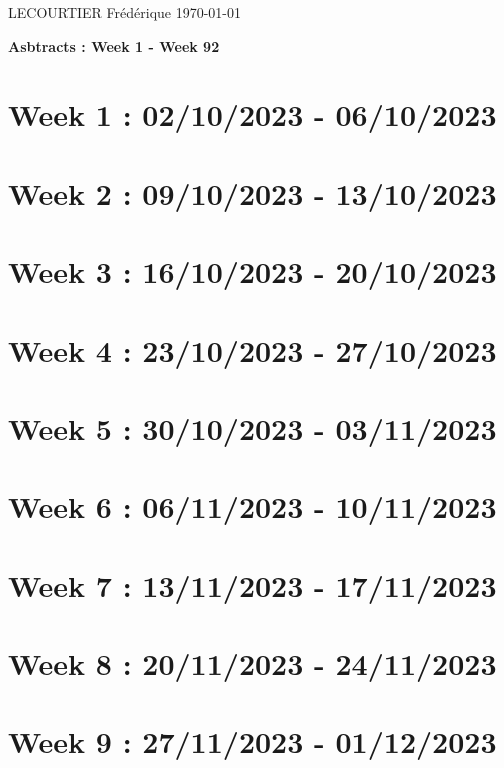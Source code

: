 \documentclass[french]{article}
\begin{document}
	LECOURTIER Frédérique \hfill \today
	\begin{center}
		\Large\textbf{{Asbtracts : Week 1 - Week 92}}
	\end{center}

	\section{Week 1 : 02/10/2023 - 06/10/2023}
	

	\section{Week 2 : 09/10/2023 - 13/10/2023}
	

	\section{Week 3 : 16/10/2023 - 20/10/2023}
	

	\section{Week 4 : 23/10/2023 - 27/10/2023}
	

	\section{Week 5 : 30/10/2023 - 03/11/2023}
	

	\section{Week 6 : 06/11/2023 - 10/11/2023}
	

	\section{Week 7 : 13/11/2023 - 17/11/2023}
	

	\section{Week 8 : 20/11/2023 - 24/11/2023}
	

	\section{Week 9 : 27/11/2023 - 01/12/2023}
	
\end{document}
